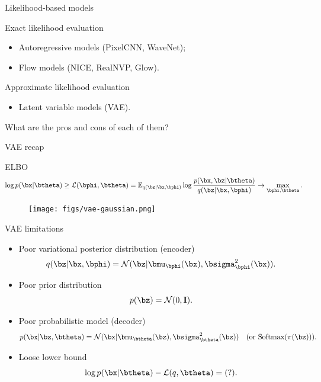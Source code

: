 \begin{frame}{Likelihood-based models}
	\begin{block}{Exact likelihood evaluation}
		\begin{itemize}
			\item Autoregressive models (PixelCNN, WaveNet);
			\item Flow models (NICE, RealNVP, Glow).
		\end{itemize}
	\end{block}
	\begin{block}{Approximate likelihood evaluation}
		\begin{itemize}
			\item Latent variable models (VAE).
		\end{itemize}
	\end{block}
	What are the pros and cons of each of them? \\
	\vspace{0.2cm}
\end{frame}
\begin{frame}{VAE recap}
	\begin{block}{ELBO}
	\vspace{-0.3cm}
	\[
	\log p(\bx | \btheta) \geq \mathcal{L} (\bphi, \btheta)  = \mathbb{E}_{q(\bz | \bx, \bphi)} \log \frac{p(\bx, \bz | \btheta)}{q(\bz| \bx, \bphi)} \rightarrow \max_{\bphi, \btheta}.
	\]
	\vspace{-0.5cm}
	\end{block}
	\begin{figure}[h]
		\centering
		\texttt{[image: figs/vae-gaussian.png]}
	\end{figure}
	
\end{frame}
\begin{frame}{VAE limitations}
	\begin{itemize}
		\item Poor variational posterior distribution (encoder)
		\[
		q(\bz | \bx, \bphi) = \mathcal{N}(\bz| \bmu_{\bphi}(\bx), \bsigma^2_{\bphi}(\bx)).
		\]
		\item Poor prior distribution
		\[
		p(\bz) = \mathcal{N}(0, \mathbf{I}).
		\]
		\item Poor probabilistic model (decoder)
		\[
		p(\bx | \bz, \btheta) = \mathcal{N}(\bx| \bmu_{\btheta}(\bz), \bsigma^2_{\btheta}(\bz)) \quad (\text{or } \text{Softmax}(\pi(\bz))).
		\]
		\item Loose lower bound
		\[
		\log p(\bx | \btheta) - \mathcal{L}(q, \btheta) = (?).
		\]
	\end{itemize}
\end{frame}
